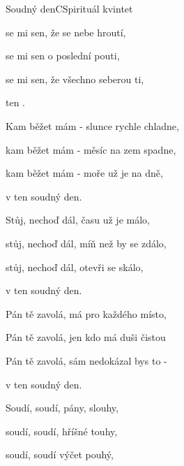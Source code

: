 \setcounter{page}{81}
\begin{song}{Soudný den}{C}{Spirituál kvintet}

\begin{SBVerse}

 se mi sen, že se nebe hroutí,

 se mi sen o poslední pouti,

 se mi sen, že všechno seberou ti,

 ten  .

\end{SBVerse}

\begin{SBVerse}

Kam běžet mám - slunce rychle chladne,

kam běžet mám - měsíc na zem spadne,

kam běžet mám - moře už je na dně,

v ten soudný den.

\end{SBVerse}

\begin{SBVerse}

Stůj, nechoď dál, času už je málo,

stůj, nechoď dál, míň než by se zdálo,

stůj, nechoď dál, otevři se skálo,

v ten soudný den.

\end{SBVerse}

\begin{SBVerse}

Pán tě zavolá, má pro každého místo,

Pán tě zavolá, jen kdo má duši čistou

Pán tě zavolá, sám nedokázal bys to -

v ten soudný den.

\end{SBVerse}

\begin{SBChorus}

Soudí, soudí, pány, slouhy,

soudí, soudí, hříšné touhy,

soudí, soudí výčet pouhý,

\end{SBChorus}

\begin{SBChorus*}


\end{SBChorus*}
\end{song}
